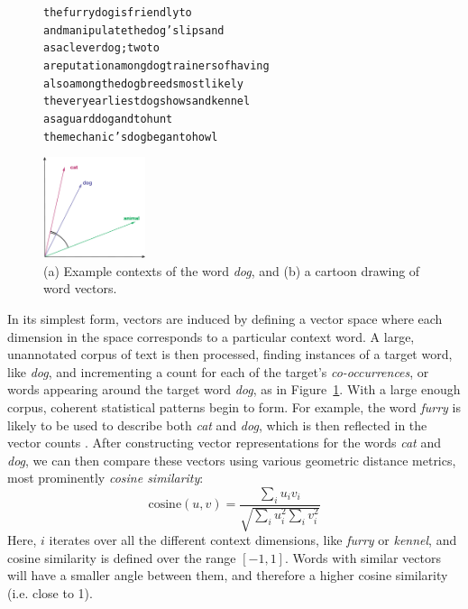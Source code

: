 \begin{figure}
\centering
\begin{minipage}{7cm}
\begin{scriptsize}
\begin{alltt}
         the furry {dog} is friendly to
and manipulate the {dog} 's lips and
       as a clever {dog} ; two to
a reputation among {dog} trainers of having
    also among the {dog} breeds most likely
 the very earliest {dog} shows and kennel
        as a guard {dog} and to hunt
   the mechanic 's {dog} began to howl
\end{alltt}
\end{scriptsize}
\end{minipage}\qquad
\begin{minipage}{3cm}
\includegraphics[width=3cm]{figures/vsm}
\end{minipage}
\caption{(a) Example contexts of the word {\em dog}, and (b) a cartoon drawing
of word vectors.}
\label{fig:vsm}
\end{figure}

In its simplest form, vectors are induced by defining a vector space where
each dimension in the space corresponds to a particular context word. A large,
unannotated corpus of text is then processed, finding instances of a target word,
like {\em dog}, and incrementing a count for each of the target's {\em
co-occurrences}, or words appearing around the target word
{\em dog}, as in Figure~\ref{fig:vsm}. With a large enough corpus, coherent
statistical patterns begin to form. For example, the word {\em furry} is likely
to be used to describe both {\em cat} and {\em dog}, which is then reflected in
the vector counts \cite{lund:1996:brmic}. After constructing vector
representations for the words {\em cat} and {\em dog}, we can then compare
these vectors using various geometric distance metrics, most prominently {\em
cosine similarity}:
\begin{equation}
  \text{cosine}(u, v) = \frac{\sum_i u_iv_i}{\sqrt{\sum_i u_i^2 \sum_i v_i^2}}
  \label{eq:cos}
\end{equation}
Here, $i$ iterates over all the different context dimensions, like {\em furry}
or {\em kennel}, and cosine similarity is defined over the range $[-1, 1]$.
Words with similar vectors will have a smaller angle between them, and therefore
a higher cosine similarity (i.e. close to 1).

